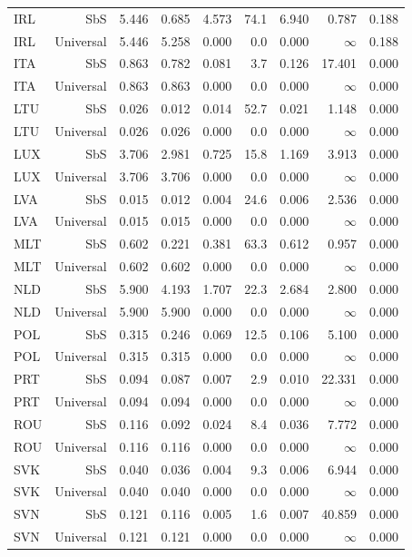 {\begin{longtable}{@{}lrrrrrrrr@{}}
IRL & SbS & 5.446 & 0.685 & 4.573 & 74.1 & 6.940 &  0.787 & 0.188 \\
IRL & Universal & 5.446 & 5.258 & 0.000 &  0.0 & 0.000 & $\infty$ & 0.188 \\
ITA & SbS & 0.863 & 0.782 & 0.081 &  3.7 & 0.126 & 17.401 & 0.000 \\
ITA & Universal & 0.863 & 0.863 & 0.000 &  0.0 & 0.000 & $\infty$ & 0.000 \\
LTU & SbS & 0.026 & 0.012 & 0.014 & 52.7 & 0.021 &  1.148 & 0.000 \\
LTU & Universal & 0.026 & 0.026 & 0.000 &  0.0 & 0.000 & $\infty$ & 0.000 \\
LUX & SbS & 3.706 & 2.981 & 0.725 & 15.8 & 1.169 &  3.913 & 0.000 \\
LUX & Universal & 3.706 & 3.706 & 0.000 &  0.0 & 0.000 & $\infty$ & 0.000 \\
LVA & SbS & 0.015 & 0.012 & 0.004 & 24.6 & 0.006 &  2.536 & 0.000 \\
LVA & Universal & 0.015 & 0.015 & 0.000 &  0.0 & 0.000 & $\infty$ & 0.000 \\
MLT & SbS & 0.602 & 0.221 & 0.381 & 63.3 & 0.612 &  0.957 & 0.000 \\
MLT & Universal & 0.602 & 0.602 & 0.000 &  0.0 & 0.000 & $\infty$ & 0.000 \\
NLD & SbS & 5.900 & 4.193 & 1.707 & 22.3 & 2.684 &  2.800 & 0.000 \\
NLD & Universal & 5.900 & 5.900 & 0.000 &  0.0 & 0.000 & $\infty$ & 0.000 \\
POL & SbS & 0.315 & 0.246 & 0.069 & 12.5 & 0.106 &  5.100 & 0.000 \\
POL & Universal & 0.315 & 0.315 & 0.000 &  0.0 & 0.000 & $\infty$ & 0.000 \\
PRT & SbS & 0.094 & 0.087 & 0.007 &  2.9 & 0.010 & 22.331 & 0.000 \\
PRT & Universal & 0.094 & 0.094 & 0.000 &  0.0 & 0.000 & $\infty$ & 0.000 \\
ROU & SbS & 0.116 & 0.092 & 0.024 &  8.4 & 0.036 &  7.772 & 0.000 \\
ROU & Universal & 0.116 & 0.116 & 0.000 &  0.0 & 0.000 & $\infty$ & 0.000 \\
SVK & SbS & 0.040 & 0.036 & 0.004 &  9.3 & 0.006 &  6.944 & 0.000 \\
SVK & Universal & 0.040 & 0.040 & 0.000 &  0.0 & 0.000 & $\infty$ & 0.000 \\
SVN & SbS & 0.121 & 0.116 & 0.005 &  1.6 & 0.007 & 40.859 & 0.000 \\
SVN & Universal & 0.121 & 0.121 & 0.000 &  0.0 & 0.000 & $\infty$ & 0.000 \\

\end{longtable}}
